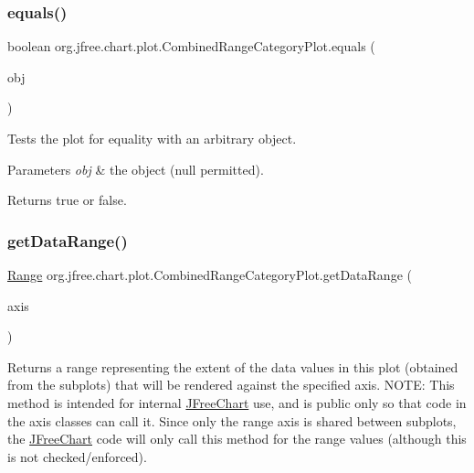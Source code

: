 \subsubsection{\texorpdfstring{equals()}{equals()}}
{\footnotesize\ttfamily boolean org.\+jfree.\+chart.\+plot.\+Combined\+Range\+Category\+Plot.\+equals (\begin{DoxyParamCaption}\item[{Object}]{obj }\end{DoxyParamCaption})}

Tests the plot for equality with an arbitrary object.


\begin{DoxyParams}{Parameters}
{\em obj} & the object ({\ttfamily null} permitted).\\
\hline
\end{DoxyParams}
\begin{DoxyReturn}{Returns}
{\ttfamily true} or {\ttfamily false}. 
\end{DoxyReturn}
\mbox{\label{classorg_1_1jfree_1_1chart_1_1plot_1_1_combined_range_category_plot_a1bf0007925eb1e5aab244a7a12a5ee13}} 
\subsubsection{\texorpdfstring{get\+Data\+Range()}{getDataRange()}}
{\footnotesize\ttfamily \mbox{\hyperlink{classorg_1_1jfree_1_1data_1_1_range}{Range}} org.\+jfree.\+chart.\+plot.\+Combined\+Range\+Category\+Plot.\+get\+Data\+Range (\begin{DoxyParamCaption}\item[{\mbox{\hyperlink{classorg_1_1jfree_1_1chart_1_1axis_1_1_value_axis}{Value\+Axis}}}]{axis }\end{DoxyParamCaption})}

Returns a range representing the extent of the data values in this plot (obtained from the subplots) that will be rendered against the specified axis. N\+O\+TE\+: This method is intended for internal \mbox{\hyperlink{classorg_1_1jfree_1_1chart_1_1_j_free_chart}{J\+Free\+Chart}} use, and is public only so that code in the axis classes can call it. Since only the range axis is shared between subplots, the \mbox{\hyperlink{classorg_1_1jfree_1_1chart_1_1_j_free_chart}{J\+Free\+Chart}} code will only call this method for the range values (although this is not checked/enforced).


